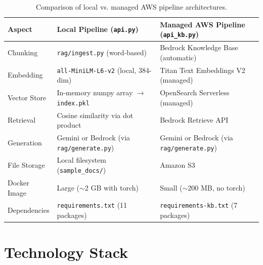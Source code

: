 \documentclass[11pt,a4paper]{paper}
\begin{document}
\begin{table}[h]
\centering
\small
\begin{tabular}{>{\raggedright}p{3.5cm} >{\raggedright}p{5.5cm} >{\raggedright\arraybackslash}p{5.5cm}}
\toprule
\textbf{Aspect} & \textbf{Local Pipeline (\texttt{api.py})} & \textbf{Managed AWS Pipeline (\texttt{api\_kb.py})} \\
\midrule
Chunking & \texttt{rag/ingest.py} (word-based) & Bedrock Knowledge Base (automatic) \\
Embedding & \texttt{all-MiniLM-L6-v2} (local, 384-dim) & Titan Text Embeddings V2 (managed) \\
Vector Store & In-memory numpy array $\rightarrow$ \texttt{index.pkl} & OpenSearch Serverless (managed) \\
Retrieval & Cosine similarity via dot product & Bedrock Retrieve API \\
Generation & Gemini or Bedrock (via \texttt{rag/generate.py}) & Gemini or Bedrock (via \texttt{rag/generate.py}) \\
File Storage & Local filesystem (\texttt{sample\_docs/}) & Amazon S3 \\
Docker Image & Large ($\sim$2 GB with torch) & Small ($\sim$200 MB, no torch) \\
Dependencies & \texttt{requirements.txt} (11 packages) & \texttt{requirements-kb.txt} (7 packages) \\
\bottomrule
\end{tabular}
\caption{Comparison of local vs. managed AWS pipeline architectures.}
\label{tab:arch-comparison}
\end{table}

\section{Technology Stack}
\label{sec:tech-stack}
\end{document}
